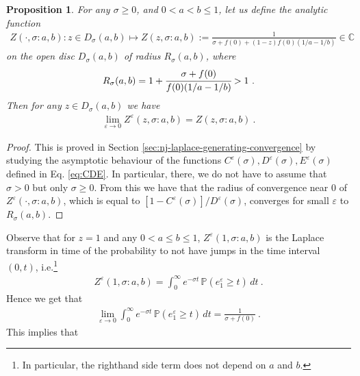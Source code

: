 \documentclass[reqno, 12pt, a4paper]{amsart}
\theoremstyle{plain}
\newtheorem{proposition}[theorem]{Proposition}
\theoremstyle{definition}
\begin{document}
 \begin{proposition}
 \label{prop:nj-laplace-generating-convergence}
For any $\sigma \ge 0$, and $0<a<b\le1$, let us define the analytic function
\begin{equation}
\begin{split}
Z(\cdot, \sigma : a,b): z \in D_{\sigma} (a,b) \mapsto Z(z,\sigma : a,b ):=\frac{1}{\sigma + f(0) + (1-z) f(0) (1/a -1/b)} \in \mathbb C 
\end{split}
\end{equation}
on the open disc $D_\sigma (a,b)$ of radius $R_\sigma (a,b)$, where
\begin{equation}
\begin{split}
R_\sigma (a,b) = 1+\cfrac{\sigma + f(0)}{f(0) (1/a -1/b)} >1 \ .
\end{split}
\end{equation}
Then for any $z\in D_{\sigma} (a,b)$ we have 
 \begin{equation}
\begin{split}
\lim_{\varepsilon \to 0} Z^\varepsilon (z,\sigma : a,b) = Z(z,\sigma : a,b ) \ .
\end{split}
\end{equation}
\end{proposition} 

\begin{proof}
This is proved in Section \ref{sec:nj-laplace-generating-convergence} by studying the asymptotic behaviour of the functions $C^\varepsilon(\sigma), D^{\varepsilon} (\sigma), E^{\varepsilon} (\sigma)$ defined in Eq. \eqref{eq:CDE}. In particular, there, we do not have to assume that $\sigma>0$ but only $\sigma\ge 0$. From this we have that the radius of convergence near $0$ of $Z^{\varepsilon} (\cdot, \sigma : a,b)$, which is equal to $[1-C^\varepsilon (\sigma)]/D^\varepsilon (\sigma)$, converges for small $\varepsilon$ to $R_\sigma (a,b)$.
\end{proof}


Observe that for $z=1$ and any $0<a\le b \le 1$, $Z^\varepsilon (1,\sigma : a,b)$ is the Laplace transform in time of the probability to not have jumps in the time interval $(0,t)$, i.e.{\footnote{In particular, the righthand side term does not depend on $a$ and $b$.}}
\begin{equation}
\begin{split}
Z^\varepsilon (1, \sigma : a,b) =\int_0^\infty e^{-\sigma t} \, \mathbb P ( e_1^\varepsilon \ge t ) \, dt \ .
\end{split}
\end{equation}
Hence we get that
\begin{equation}
\begin{split}
\lim_{\varepsilon \to 0} \int_0^\infty e^{-\sigma t} \, \mathbb P (e_1^\varepsilon \ge t ) \, dt =  \frac{1}{\sigma + f(0)} \ .
\end{split}
\end{equation}
This implies that
\end{document}
